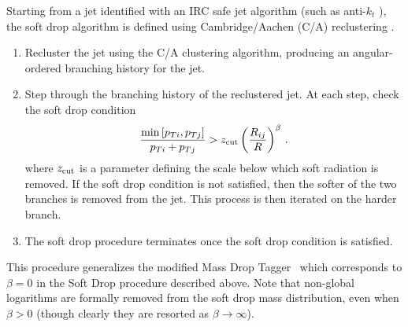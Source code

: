 Starting from a jet identified with an IRC safe jet algorithm (such as
anti-$k_t$ \cite{Cacciari:2008gp}), the soft drop algorithm is defined
using Cambridge/Aachen (C/A) reclustering
\cite{Dokshitzer:1997in,Wobisch:1998wt,Wobisch:2000dk}.  \begin{enumerate}

\item Recluster the jet using the C/A clustering algorithm, producing an angular-ordered branching history for the jet.

\item Step through the branching history of the reclustered jet.  At each step, check the soft drop condition
\begin{align}\label{eq:sd_cut}
\frac{\min\left[ p_{Ti}, p_{Tj}  \right]}{p_{Ti}+p_{Tj}}> z_{\rm cut} \left(   \frac{R_{ij}}{R}\right)^\beta \,.
\end{align}
where $z_{\rm cut}$ is a parameter defining the scale below which soft radiation is removed.  If the soft drop condition is not satisfied, then the softer of the two branches is removed from the jet.  This process is then iterated on the harder branch.

\item The soft drop procedure terminates once the soft drop condition is satisfied.

\end{enumerate}

\noindent This procedure generalizes the modified Mass Drop
  Tagger~\cite{Dasgupta:2013ihk} which corresponds to $\beta=0$ in the
  Soft Drop procedure described above.  Note that non-global logarithms are formally removed from the soft drop mass distribution, even when $\beta>0$ (though clearly they are resorted as $\beta\rightarrow\infty$).






